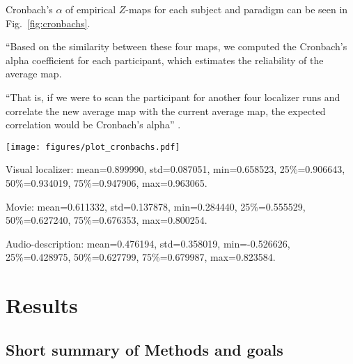 
%
Cronbach's $\alpha$ of empirical $Z$-maps for each subject and paradigm
can be seen in Fig.~\ref{fig:cronbachs}.

``Based on the similarity between these four maps, we computed the Cronbach's
alpha coefficient for each participant, which estimates the reliability of the
average map.

%
\citep{feilong2022individualized} ``That is, if we were to scan the participant
for another four localizer runs and correlate the new average map with the
current average map, the expected correlation would be Cronbach's alpha''
\citep{feilong2022individualized}.



\begin{figure*}[tbp] \centering
    \texttt{[image: figures/plot\_cronbachs.pdf]}
    \caption{\textbf{Cronbach's $\alpha$ of the empirical $Z$-maps for each
    paradigm and subject.}
    Cronbach's $\alpha$ was calculated based on the $Z$-maps yielded by the
    first-level \ac{glm} analyses of the visual localizer
    \citep{sengupta2016extension} (four runs) and naturalistic stimuli
    \citep{haeusler2022processing} (eight segments each) respectively.
    The second-level \ac{glm} analyses across runs / segments yielded the
    empirical $Z$-maps that were estimated in the present study.
    }
    \label{fig:cronbachs}
\end{figure*}

Visual localizer:  mean=0.899990, std=0.087051, min=0.658523, 25\%=0.906643,
50\%=0.934019, 75\%=0.947906, max=0.963065.

Movie: mean=0.611332, std=0.137878, min=0.284440, 25\%=0.555529, 50\%=0.627240,
75\%=0.676353, max=0.800254.

Audio-description: mean=0.476194, std=0.358019, min=-0.526626, 25\%=0.428975,
50\%=0.627799, 75\%=0.679987, max=0.823584.


\section{Results}

\subsection{Short summary of Methods and goals}


